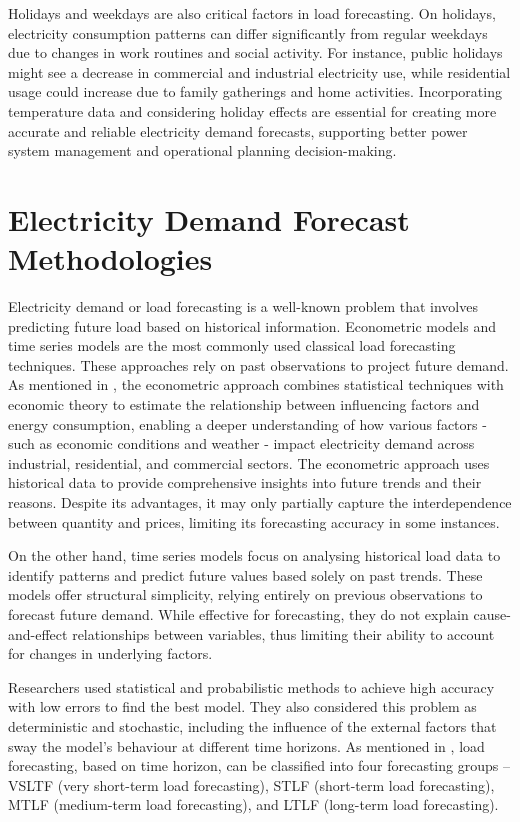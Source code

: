 \documentclass[mstat,12pt]{unswthesis}
\begin{document}
Holidays and weekdays are also critical factors in load forecasting. On
holidays, electricity consumption patterns can differ significantly from
regular weekdays due to changes in work routines and social activity.
For instance, public holidays might see a decrease in commercial and
industrial electricity use, while residential usage could increase due
to family gatherings and home activities. Incorporating temperature data
and considering holiday effects are essential for creating more accurate
and reliable electricity demand forecasts, supporting better power
system management and operational planning decision-making.

\bigskip

\section{Electricity Demand Forecast
Methodologies}\label{electricity-demand-forecast-methodologies}

Electricity demand or load forecasting is a well-known problem that
involves predicting future load based on historical information.
Econometric models and time series models are the most commonly used
classical load forecasting techniques. These approaches rely on past
observations to project future demand. As mentioned in \cite{9812604},
the econometric approach combines statistical techniques with economic
theory to estimate the relationship between influencing factors and
energy consumption, enabling a deeper understanding of how various
factors - such as economic conditions and weather - impact electricity
demand across industrial, residential, and commercial sectors. The
econometric approach uses historical data to provide comprehensive
insights into future trends and their reasons. Despite its advantages,
it may only partially capture the interdependence between quantity and
prices, limiting its forecasting accuracy in some instances.

On the other hand, time series models focus on analysing historical load
data to identify patterns and predict future values based solely on past
trends. These models offer structural simplicity, relying entirely on
previous observations to forecast future demand. While effective for
forecasting, they do not explain cause-and-effect relationships between
variables, thus limiting their ability to account for changes in
underlying factors.

\bigskip

Researchers used statistical and probabilistic methods to achieve high
accuracy with low errors to find the best model. They also considered
this problem as deterministic and stochastic, including the influence of
the external factors that sway the model's behaviour at different time
horizons. As mentioned in \cite{9812604}, load forecasting, based on
time horizon, can be classified into four forecasting groups -- VSLTF
(very short-term load forecasting), STLF (short-term load forecasting),
MTLF (medium-term load forecasting), and LTLF (long-term load
forecasting).
\end{document}
